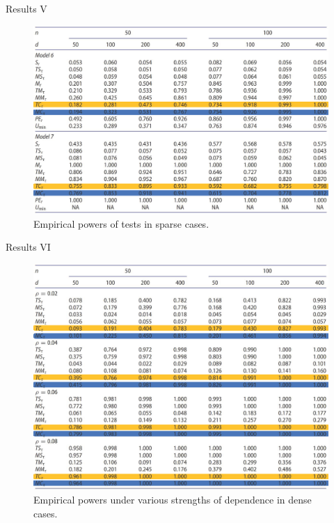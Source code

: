 \documentclass[
  ignorenonframetext,
]{beamer}
\begin{document}
\begin{frame}{Results V}
\label{results-v}
\begin{figure}

{\centering \includegraphics[width=0.8\linewidth]{Figures/Table3H} 

}

\caption{Empirical powers of tests in sparse cases.}\label{fig:Table 3}
\end{figure}
\end{frame}

\begin{frame}{Results VI}
\label{results-vi}
\begin{figure}

{\centering \includegraphics[width=0.8\linewidth,height=0.77\textheight]{Figures/Table4H} 

}

\caption{Empirical powers under various strengths of dependence in dense cases.}\label{fig:Table 4}
\end{figure}
\end{frame}
\end{document}
